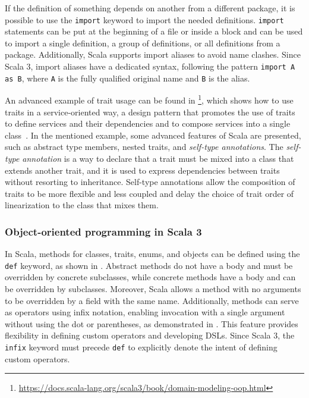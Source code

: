 If the definition of something depends on another from a different package, it is possible to use the \texttt{import} keyword to import the needed definitions.
%
\texttt{import} statements can be put at the beginning of a file or inside a block and can be used to import a single definition, a group of definitions, or all definitions from a package.
%
Additionally, Scala supports import aliases to avoid name clashes.
%
Since Scala 3, import aliases have a dedicated syntax, following the pattern \texttt{import A as B}, where \texttt{A} is the fully qualified original name and \texttt{B} is the alias.

An advanced example of trait usage can be found in \footnote{\url{https://docs.scala-lang.org/scala3/book/domain-modeling-oop.html}}, which shows how to use traits in a service-oriented way, a design pattern that promotes the use of traits to define services and their dependencies and to compose services into a single class~\cite{service-oriented-design}.
%
In the mentioned example, some advanced features of Scala are presented, such as abstract type members, nested traits, and \textit{self-type annotations}.
%
The \textit{self-type annotation} is a way to declare that a trait must be mixed into a class that extends another trait, and it is used to express dependencies between traits without resorting to inheritance.
%
Self-type annotations allow the composition of traits to be more flexible and less coupled and delay the choice of trait order of linearization to the class that mixes them.



\subsubsection{Object-oriented programming in Scala 3}

In Scala, methods for classes, traits, enums, and objects can be defined using the \texttt{def} keyword, as shown in .
%
Abstract methods do not have a body and must be overridden by concrete subclasses, while concrete methods have a body and can be overridden by subclasses.
%
Moreover, Scala allows a method with no arguments to be overridden by a field with the same name.
%
Additionally, methods can serve as operators using infix notation, enabling invocation with a single argument without using the dot or parentheses, as demonstrated in .
%
This feature provides flexibility in defining custom operators and developing \ac{DSL}s.
%
Since Scala 3, the \texttt{infix} keyword must precede \texttt{def} to explicitly denote the intent of defining custom operators.


